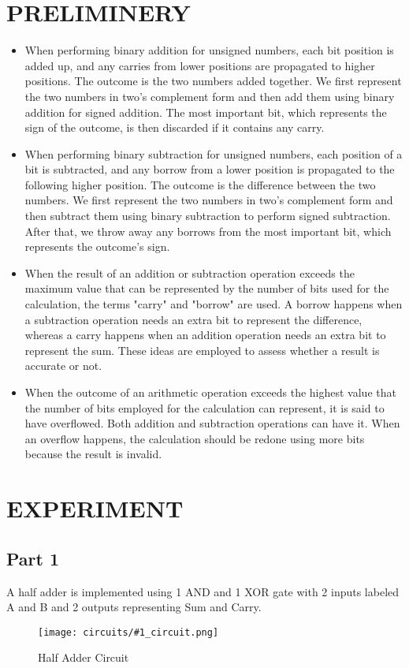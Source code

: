 \documentclass[pdftex,12pt,a4paper]{article}
\theoremstyle{plain}
\newcommand{\circuit}[1]{
    \begin{figure}[H]
    	\centering
    	\texttt{[image: circuits/\#1\_circuit.png]}
    	\caption{#1 Circuit}
    	\label{fig7}
    \end{figure}
    \vspace{1cm}
}
\begin{document}
\section{PRELIMINERY}
    \begin{itemize}
        \item When performing binary addition for unsigned numbers, each bit position is added up, and any carries from lower positions are propagated to higher positions. The outcome is the two numbers added together. We first represent the two numbers in two's complement form and then add them using binary addition for signed addition. The most important bit, which represents the sign of the outcome, is then discarded if it contains any carry. 
        \item When performing binary subtraction for unsigned numbers, each position of a bit is subtracted, and any borrow from a lower position is propagated to the following higher position. The outcome is the difference between the two numbers. We first represent the two numbers in two's complement form and then subtract them using binary subtraction to perform signed subtraction. After that, we throw away any borrows from the most important bit, which represents the outcome's sign. 
        \item When the result of an addition or subtraction operation exceeds the maximum value that can be represented by the number of bits used for the calculation, the terms "carry" and "borrow" are used. A borrow happens when a subtraction operation needs an extra bit to represent the difference, whereas a carry happens when an addition operation needs an extra bit to represent the sum. These ideas are employed to assess whether a result is accurate or not.
        \item When the outcome of an arithmetic operation exceeds the highest value that the number of bits employed for the calculation can represent, it is said to have overflowed. Both addition and subtraction operations can have it. When an overflow happens, the calculation should be redone using more bits because the result is invalid. 
    \end{itemize}

\newpage
\section{EXPERIMENT}
    \subsection{Part 1}
        A half adder is implemented using 1 AND and 1 XOR gate with 2 inputs labeled A and B and 2 outputs representing Sum and Carry.
        \circuit{Half Adder}
        
\end{document}
